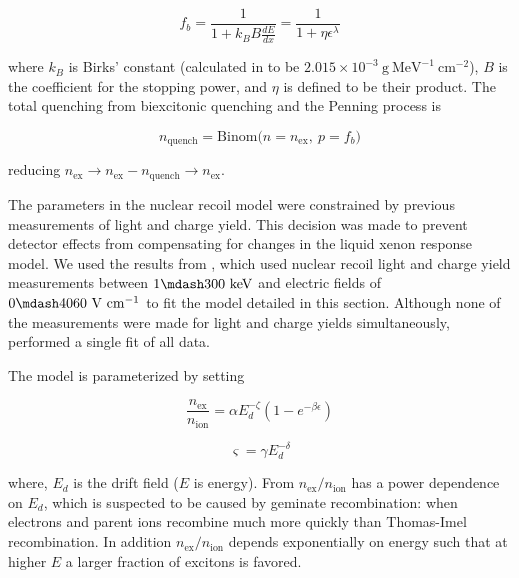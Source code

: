 \begin{equation}
f_b = \frac{1}{1 + k_{B}B \frac{dE}{dx}} = \frac{1}{1 + \eta \epsilon^{\lambda}}
\label{eq:er_nr_calibrations_parameter_determ_nr_birks}
\end{equation}

\noindent where $k_B$ is Birks' constant (calculated in  to be $2.015 \times 10^{-3}\ \mathrm{g\ MeV^{-1}\ cm^{-2}}$),
$B$ is the coefficient for the stopping power, and $\eta$ is defined to be their product.  The total quenching from biexcitonic
quenching and the Penning process is

\begin{equation}
n_{\mathrm{quench}} = \mathrm{Binom} \big( n = n_{\mathrm{ex}},\ p = f_b \big)
\end{equation}

\noindent reducing $n_{\mathrm{ex}} \rightarrow n_{\mathrm{ex}} - n_{\mathrm{quench}} \rightarrow n_{\mathrm{ex}}$.

The parameters in the nuclear recoil model were constrained by previous measurements of light and charge
yield.  This decision was made to prevent detector effects from compensating for changes
in the liquid xenon response model.  We used the results from , which used nuclear recoil light and charge yield
measurements between $1 \mdash 300\ \mathrm{keV}$ and electric fields of $0 \mdash 4060\ \mathrm{V\ cm^{-1}}$ to fit the model
detailed in this section.  Although none of the measurements were made for light and charge yields simultaneously, 
performed a single fit of all data.

The model is parameterized by setting

\begin{equation}
\frac{n_{\mathrm{ex}}}{n_{\mathrm{ion}}} = \alpha E_{d}^{-\zeta} ( 1 - e^{-\beta \epsilon})
\label{eq:er_nr_calibrations_parameter_determ_nr_nex_nion}
\end{equation}

\begin{equation}
\varsigma = \gamma E_{d}^{- \delta}
\label{eq:er_nr_calibrations_parameter_determ_nr_recomb_sigma}
\end{equation}

\noindent where, $E_d$ is the drift field ($E$ is energy).  From 
$n_{\mathrm{ex}} / n_{\mathrm{ion}}$ has a power dependence on $E_d$,
which is suspected to be caused by geminate recombination: when electrons and parent ions recombine much more quickly than Thomas-Imel
recombination.  In addition $n_{\mathrm{ex}} / n_{\mathrm{ion}}$ depends exponentially on energy such that at higher $E$ a larger fraction
of excitons is favored.

